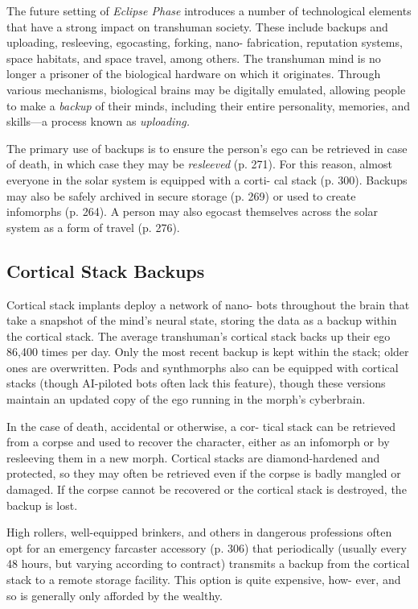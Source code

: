 The future setting of \textit{Eclipse Phase} introduces a 
number of technological elements that have a strong 
impact on transhuman society. These include backups 
and uploading, resleeving, egocasting, forking, nano-
fabrication, reputation systems, space habitats, and 
space travel, among others.
The transhuman mind is no longer a prisoner of the 
biological hardware on which it originates. Through 
various mechanisms, biological brains may be digitally 
emulated, allowing people to make a \textit{backup }of their 
minds, including their entire personality, memories, 
and skills—a process known as \textit{uploading.}

The primary use of backups is to ensure the person's 
ego can be retrieved in case of death, in which case 
they may be \textit{resleeved} (p. 271). For this reason, almost 
everyone in the solar system is equipped with a corti-
cal stack (p. 300). Backups may also be safely archived 
in secure storage (p. 269) or used to create infomorphs 
(p. 264). A person may also egocast themselves across 
the solar system as a form of travel (p. 276).

\subsection{Cortical Stack Backups}

Cortical stack implants deploy a network of nano-
bots throughout the brain that take a snapshot of 
the mind's neural state, storing the data as a backup 
within the cortical stack. The average transhuman's 
cortical stack backs up their ego 86,400 times per day. 
Only the most recent backup is kept within the stack; 
older ones are overwritten. Pods and synthmorphs 
also can be equipped with cortical stacks (though 
AI-piloted bots often lack this feature), though these 
versions maintain an updated copy of the ego running 
in the morph's cyberbrain.

In the case of death, accidental or otherwise, a cor-
tical stack can be retrieved from a corpse and used to 
recover the character, either as an infomorph or by 
resleeving them in a new morph. Cortical stacks are 
diamond-hardened and protected, so they may often 
be retrieved even if the corpse is badly mangled or 
damaged. If the corpse cannot be recovered or the 
cortical stack is destroyed, the backup is lost.

High rollers, well-equipped brinkers, and others 
in dangerous professions often opt for an emergency 
farcaster accessory (p. 306) that periodically (usually 
every 48 hours, but varying according to contract) 
transmits a backup from the cortical stack to a remote 
storage facility. This option is quite expensive, how-
ever, and so is generally only afforded by the wealthy.

